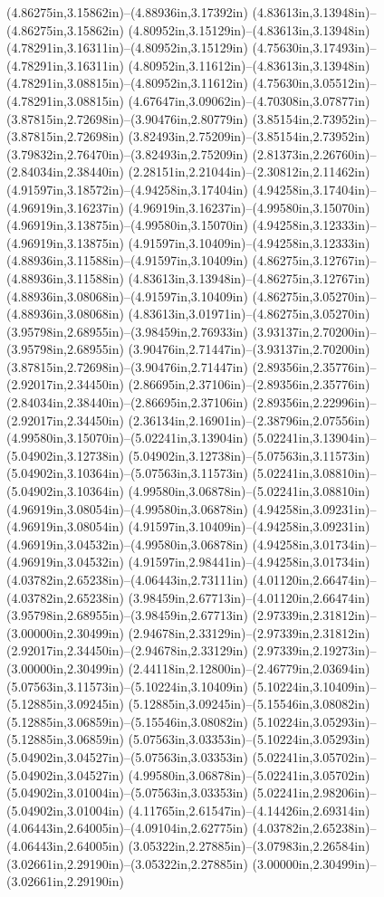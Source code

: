 (4.86275in,3.15862in)--(4.88936in,3.17392in) (4.83613in,3.13948in)--(4.86275in,3.15862in) (4.80952in,3.15129in)--(4.83613in,3.13948in) (4.78291in,3.16311in)--(4.80952in,3.15129in) (4.75630in,3.17493in)--(4.78291in,3.16311in) (4.80952in,3.11612in)--(4.83613in,3.13948in) (4.78291in,3.08815in)--(4.80952in,3.11612in) (4.75630in,3.05512in)--(4.78291in,3.08815in) (4.67647in,3.09062in)--(4.70308in,3.07877in) (3.87815in,2.72698in)--(3.90476in,2.80779in) (3.85154in,2.73952in)--(3.87815in,2.72698in) (3.82493in,2.75209in)--(3.85154in,2.73952in) (3.79832in,2.76470in)--(3.82493in,2.75209in) (2.81373in,2.26760in)--(2.84034in,2.38440in) (2.28151in,2.21044in)--(2.30812in,2.11462in) (4.91597in,3.18572in)--(4.94258in,3.17404in) (4.94258in,3.17404in)--(4.96919in,3.16237in) (4.96919in,3.16237in)--(4.99580in,3.15070in) (4.96919in,3.13875in)--(4.99580in,3.15070in) (4.94258in,3.12333in)--(4.96919in,3.13875in) (4.91597in,3.10409in)--(4.94258in,3.12333in) (4.88936in,3.11588in)--(4.91597in,3.10409in) (4.86275in,3.12767in)--(4.88936in,3.11588in) (4.83613in,3.13948in)--(4.86275in,3.12767in) (4.88936in,3.08068in)--(4.91597in,3.10409in) (4.86275in,3.05270in)--(4.88936in,3.08068in) (4.83613in,3.01971in)--(4.86275in,3.05270in) (3.95798in,2.68955in)--(3.98459in,2.76933in) (3.93137in,2.70200in)--(3.95798in,2.68955in) (3.90476in,2.71447in)--(3.93137in,2.70200in) (3.87815in,2.72698in)--(3.90476in,2.71447in) (2.89356in,2.35776in)--(2.92017in,2.34450in) (2.86695in,2.37106in)--(2.89356in,2.35776in) (2.84034in,2.38440in)--(2.86695in,2.37106in) (2.89356in,2.22996in)--(2.92017in,2.34450in) (2.36134in,2.16901in)--(2.38796in,2.07556in) (4.99580in,3.15070in)--(5.02241in,3.13904in) (5.02241in,3.13904in)--(5.04902in,3.12738in) (5.04902in,3.12738in)--(5.07563in,3.11573in) (5.04902in,3.10364in)--(5.07563in,3.11573in) (5.02241in,3.08810in)--(5.04902in,3.10364in) (4.99580in,3.06878in)--(5.02241in,3.08810in) (4.96919in,3.08054in)--(4.99580in,3.06878in) (4.94258in,3.09231in)--(4.96919in,3.08054in) (4.91597in,3.10409in)--(4.94258in,3.09231in) (4.96919in,3.04532in)--(4.99580in,3.06878in) (4.94258in,3.01734in)--(4.96919in,3.04532in) (4.91597in,2.98441in)--(4.94258in,3.01734in) (4.03782in,2.65238in)--(4.06443in,2.73111in) (4.01120in,2.66474in)--(4.03782in,2.65238in) (3.98459in,2.67713in)--(4.01120in,2.66474in) (3.95798in,2.68955in)--(3.98459in,2.67713in) (2.97339in,2.31812in)--(3.00000in,2.30499in) (2.94678in,2.33129in)--(2.97339in,2.31812in) (2.92017in,2.34450in)--(2.94678in,2.33129in) (2.97339in,2.19273in)--(3.00000in,2.30499in) (2.44118in,2.12800in)--(2.46779in,2.03694in) (5.07563in,3.11573in)--(5.10224in,3.10409in) (5.10224in,3.10409in)--(5.12885in,3.09245in) (5.12885in,3.09245in)--(5.15546in,3.08082in) (5.12885in,3.06859in)--(5.15546in,3.08082in) (5.10224in,3.05293in)--(5.12885in,3.06859in) (5.07563in,3.03353in)--(5.10224in,3.05293in) (5.04902in,3.04527in)--(5.07563in,3.03353in) (5.02241in,3.05702in)--(5.04902in,3.04527in) (4.99580in,3.06878in)--(5.02241in,3.05702in) (5.04902in,3.01004in)--(5.07563in,3.03353in) (5.02241in,2.98206in)--(5.04902in,3.01004in) (4.11765in,2.61547in)--(4.14426in,2.69314in) (4.06443in,2.64005in)--(4.09104in,2.62775in) (4.03782in,2.65238in)--(4.06443in,2.64005in) (3.05322in,2.27885in)--(3.07983in,2.26584in) (3.02661in,2.29190in)--(3.05322in,2.27885in) (3.00000in,2.30499in)--(3.02661in,2.29190in) 